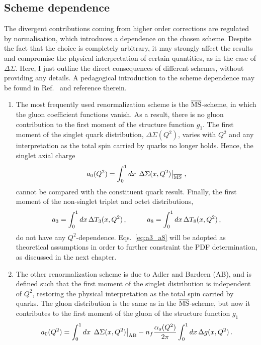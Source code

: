 \subsection{Scheme dependence}
The divergent contributions coming from higher order corrections are regulated by normalisation, which introduces a dependence on the chosen scheme. Despite the fact that the choice is completely arbitrary, it may strongly affect the results and compromise the physical interpretation of certain quantities, as in the case of $\Delta \Sigma$. Here, I just outline the direct consequences of different schemes, without providing any details. A pedagogical introduction to the scheme dependence may be found in Ref.~\cite{leader_2001} and reference therein. 
\begin{enumerate}
  \item The most frequently used renormalization scheme is the $\overline{\textrm{MS}}$-scheme, in which the gluon coefficient functions vanish. As a result, there is no gluon contribution to the first moment of the structure function $g_1$. The first moment of the singlet quark distribution, $\Delta \Sigma (Q^2)$, varies with $Q^2$ and any interpretation as the total spin carried by quarks no longer holds. Hence, the singlet axial charge 
  \begin{equation}
    a_0 (Q^2) = \int_{0}^{1} dx \,  \left.\Delta \Sigma(x,Q^2) \right|_{\overline{\textrm{MS}}} \,,
    \label{eq:MSB_scheme}
  \end{equation}
  cannot be compared with the constituent quark result. Finally, the first moment of the non-singlet triplet and octet distributions,
  \begin{equation}
    a_3 = \int_{0}^{1} dx \, \Delta T_3 (x,Q^2) \,, \hspace{10mm} a_8 = \int_{0}^{1} dx \, \Delta T_8 (x,Q^2) \,,
    \label{eq:a3_a8}
  \end{equation}
  do not have any $Q^2$-dependence. Eqs.~\eqref{eq:a3_a8} will be adopted as theoretical assumptions in order to further constraint the PDF determination, as discussed in the next chapter.
  
  \item The other renormalization scheme is due to Adler and Bardeen (AB), and is defined such that the first moment of the singlet distribution is independent of $Q^2$, restoring the physical interpretation as the total spin carried by quarks. The gluon distribution is the same as in the $\overline{\textrm{MS}}$-scheme, but now it contributes to the first moment of the gluon of the structure function $g_1$
  \begin{equation}
    a_{0}(Q^2) = \int_{0}^{1} dx \, \left. \Delta \Sigma (x,Q^2) \right|_{\textrm{AB}} - n_f \frac{\alpha_s(Q^2)}{2\pi} \int_{0}^{1} dx \, \Delta g(x,Q^2) \,.
    \label{eq:AB_scheme}
  \end{equation}
\end{enumerate}
